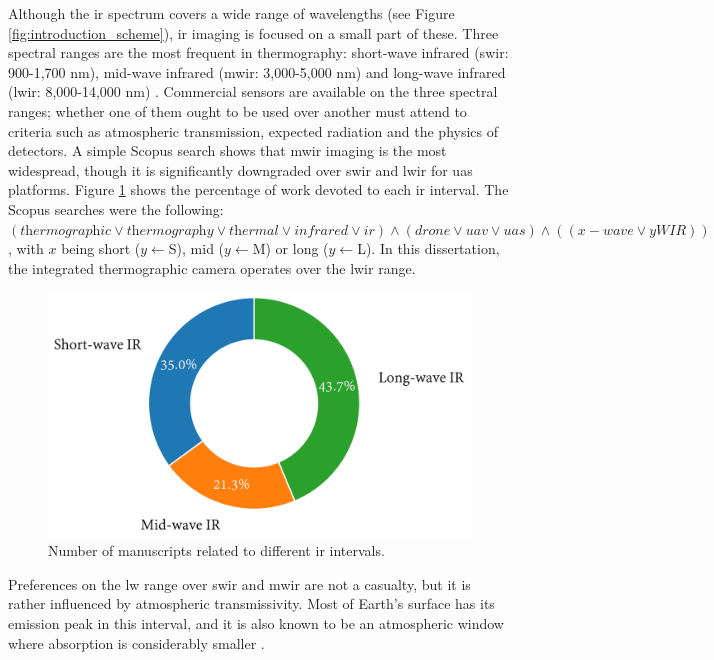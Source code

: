 Although the \acrshort{ir} spectrum covers a wide range of wavelengths (see Figure \ref{fig:introduction_scheme}), \acrshort{ir} imaging is focused on a small part of these. Three spectral ranges are the most frequent in thermography: short-wave infrared (\acrshort{swir}: 900-1,700 \si{\nano\meter}), mid-wave infrared (\acrshort{mwir}: 3,000-5,000 \si{\nano\meter}) and long-wave infrared (\acrshort{lwir}: 8,000-14,000 \si{\nano\meter}) \cite{gade_thermal_2014, vollmer_infrared_2017}. Commercial sensors are available on the three spectral ranges; whether one of them ought to be used over another must attend to criteria such as atmospheric transmission, expected radiation and the physics of detectors. A simple Scopus search shows that \acrshort{mwir} imaging is the most widespread, though it is significantly downgraded over \acrshort{swir} and \acrshort{lwir} for \acrshort{uas} platforms. Figure \ref{fig:infrared_scopus} shows the percentage of work devoted to each \acrshort{ir} interval. The Scopus searches were the following: $(\textit{thermographic} \lor \textit{thermography} \lor \textit{thermal} \lor \textit{infrared} \lor \textit{ir}) \land (\textit{drone} \lor \textit{uav} \lor \textit{uas}) \land ((x-\textit{wave} \lor y\textit{WIR}))$, with $x$ being short ($y \gets $S), mid ($y \gets $M) or long ($y \gets $L). In this dissertation, the integrated thermographic camera operates over the \acrshort{lwir} range. 

\begin{figure}[ht]
	\includegraphics[width=\textwidth]{figs/fundamentals/infrared.png}
	\caption{Number of manuscripts related to different \acrshort{ir} intervals.  }
    \label{fig:infrared_scopus}
\end{figure}

Preferences on the \acrshort{lw} range over \acrshort{swir} and \acrshort{mwir} are not a casualty, but it is rather influenced by atmospheric transmissivity. Most of Earth's surface has its emission peak in this interval, and it is also known to be an atmospheric window where absorption is considerably smaller \cite{gonzalez_thermal_2019, quattrochi_thermal_1999}. 

